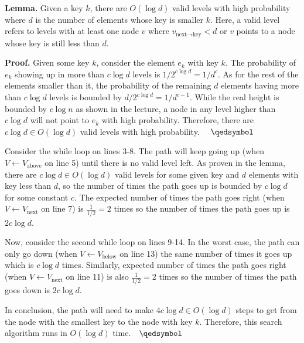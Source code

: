 \begin{tcolorbox}
\textbf{Lemma.} Given a key $k$, there are $O(\log d)$ valid levels with high probability where $d$ is the number of elements whose key is smaller $k$.
Here, a valid level refers to levels with at least one node $v$ where $v_\text{next$\to$key} < d$ or $v$ points to a node whose key is still less than $d$.

\textbf{Proof.} Given some key $k$, consider the element $e_k$ with key $k$. The probability of $e_k$ showing up in more than $c\log d$ levels is $1/2^{c\log d} = 1/d^c$.
As for the rest of the elements smaller than it, the probability of the remaining $d$ elements having more than $c\log d$ levels is bounded by $d/2^{c\log d} = 1/d^{c-1}$.
While the real height is bounded by $c\log n$ as shown in the lecture, a node in any level higher than $c\log d$ will not point to $e_k$ with high probability.
Therefore, there are $c\log d \in O(\log d)$ valid levels with high probability. $\quad\qedsymbol$
\end{tcolorbox}

Consider the while loop on lines 3-8. The path will keep going up (when $V\gets V_\text{above}$ on line 5) until there is no valid level left.
As proven in the lemma, there are $c\log d \in O(\log d)$ valid levels for some given key and $d$ elements with key less than $d$, so the number of times the path goes up is bounded by $c\log d$ for some constant $c$.
The expected number of times the path goes right (when $V \gets V_\text{next}$ on line 7) is $\frac{1}{1/2} = 2$ times so the number of times the path goes up is $2c\log d$.

Now, consider the second while loop on lines 9-14. In the worst case, the path can only go down (when $V \gets V_\text{below}$ on line 13) the same number of times it goes up which is $c\log d$ times.
Similarly, expected number of times the path goes right (when $V \gets V_\text{next}$ on line 11) is also $\frac{1}{1/2} = 2$ times so the number of times the path goes down is $2c\log d$.

In conclusion, the path will need to make $4c\log d \in O(\log d)$ steps to get from the node with the smallest key to the node with key $k$. Therefore, this search algorithm runs in $O(\log d)$ time.$\quad\qedsymbol$
